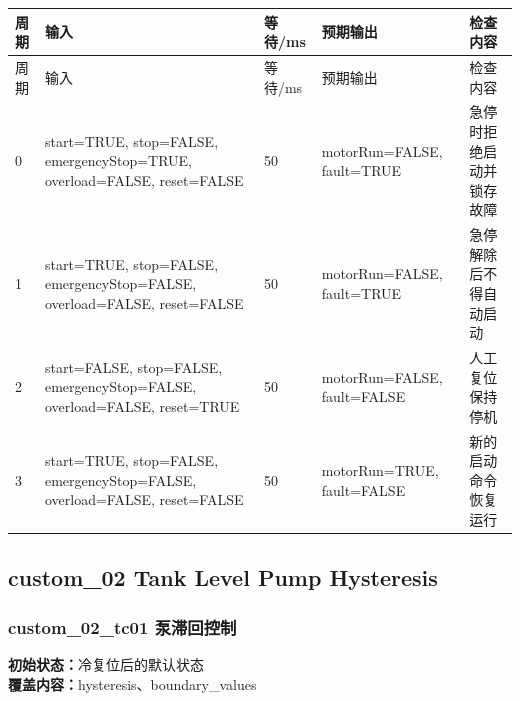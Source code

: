 \begin{longtable}{L{1.0cm}L{4.7cm}L{1.4cm}L{4.0cm}L{2.1cm}}

\toprule

周期 & 输入 & 等待/ms & 预期输出 & 检查内容\\

\midrule

\endfirsthead

\toprule

周期 & 输入 & 等待/ms & 预期输出 & 检查内容\\

\midrule

\endhead

0 & start=TRUE, stop=FALSE, emergencyStop=TRUE, overload=FALSE, reset=FALSE & 50 & motorRun=FALSE, fault=TRUE & 急停时拒绝启动并锁存故障\\

1 & start=TRUE, stop=FALSE, emergencyStop=FALSE, overload=FALSE, reset=FALSE & 50 & motorRun=FALSE, fault=TRUE & 急停解除后不得自动启动\\

2 & start=FALSE, stop=FALSE, emergencyStop=FALSE, overload=FALSE, reset=TRUE & 50 & motorRun=FALSE, fault=FALSE & 人工复位保持停机\\

3 & start=TRUE, stop=FALSE, emergencyStop=FALSE, overload=FALSE, reset=FALSE & 50 & motorRun=TRUE, fault=FALSE & 新的启动命令恢复运行\\

\bottomrule

\end{longtable}

\subsection{{\ttfamily custom\_02} Tank Level Pump Hysteresis}

\subsubsection{{\ttfamily custom\_02\_tc01} 泵滞回控制}

\noindent\textbf{初始状态：}冷复位后的默认状态\\

\textbf{覆盖内容：}hysteresis、boundary\_values

